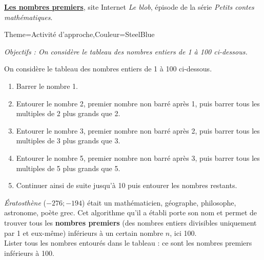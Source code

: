 \hfill \href{https://www.youtube.com/watch?v=4jPtEsDS-qI}{\bf Les nombres premiers}, site Internet {\it Le blob}, épisode de la série {\it Petits contes mathématiques}.


\begin{Maquette}[Cours]{Theme={Activité d'approche},Couleur={SteelBlue}}



      {\it Objectifs : On considère le tableau des nombres entiers de 1 à 100 ci-dessous.}

      \begin{AActivite}

         On considère le tableau des nombres entiers de 1 à 100 ci-dessous. \par
         \begin{center}
            \Erathostene
         \end{center}

            \begin{enumerate}
               \item Barrer le nombre 1.
               \item Entourer le nombre 2, premier nombre non barré après 1, puis barrer tous les multiples de 2 plus grands que 2.
               \item Entourer le nombre 3, premier nombre non barré après 2, puis barrer tous les multiples de 3 plus grands que 3.
               \item Entourer le nombre 5, premier nombre non barré après 3, puis barrer tous les multiples de 5 plus grands que 5.
               \item Continuer ainsi de suite jusqu'à 10 puis entourer les nombres restants.
            \end{enumerate}
         
            {\it Ératosthène} ($-276 ; -194$) était un mathématicien, géographe, philosophe, astronome, poète grec. Cet algorithme qu'il a établi porte son nom et permet de trouver tous les {\bf nombres premiers} (des nombres entiers divisibles uniquement par 1 et eux-même) inférieurs à un certain nombre $n$, ici 100. \\ [3mm]
            Lister tous les nombres entourés dans le tableau : ce sont les nombres premiers inférieurs à 100. \par \medskip
            \pointilles \par \medskip
            \pointilles
      \end{AActivite}

\end{Maquette}


